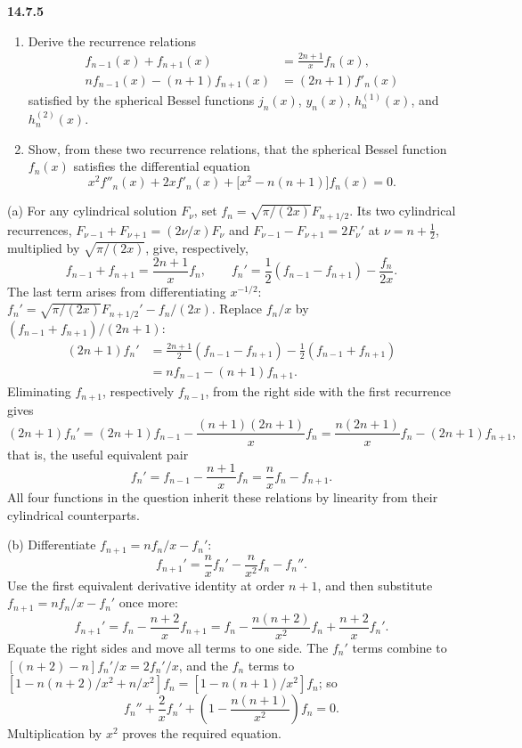 \par\bigskip
\noindent\textbf{14.7.5}
\begin{enumerate}
\item[(a)] Derive the recurrence relations
\begin{align*}
f_{n-1}(x)+f_{n+1}(x)&=\frac{2n+1}{x}f_{n}(x),\\
nf_{n-1}(x)-(n+1)f_{n+1}(x)&=(2n+1)f'_{n}(x)
\end{align*}
satisfied by the spherical Bessel functions $j_{n}(x)$, $y_{n}(x)$,
$h_{n}^{(1)}(x)$, and $h_{n}^{(2)}(x)$.
\item[(b)] Show, from these two recurrence relations, that the
spherical Bessel function $f_{n}(x)$ satisfies the differential
equation
\[
x^{2}f''_{n}(x)+2xf'_{n}(x)+\big[x^{2}-n(n+1)\big]f_{n}(x)=0.
\]
\end{enumerate}
\solution
(a) For any cylindrical solution $F_\nu$, set
$f_n=\sqrt{\pi/(2x)}F_{n+1/2}$. Its two cylindrical recurrences,
$F_{\nu-1}+F_{\nu+1}=(2\nu/x)F_\nu$ and $F_{\nu-1}-F_{\nu+1}=2F_\nu'$
at $\nu=n+\frac12$, multiplied by $\sqrt{\pi/(2x)}$,
give, respectively,
\[
f_{n-1}+f_{n+1}=\frac{2n+1}{x}f_n,
\qquad
f_n'=\frac12(f_{n-1}-f_{n+1})-\frac{f_n}{2x}.
\]
The last term arises from differentiating $x^{-1/2}$:
$f_n'=\sqrt{\pi/(2x)}F_{n+1/2}'-f_n/(2x)$.
Replace $f_n/x$ by $(f_{n-1}+f_{n+1})/(2n+1)$:
\begin{align*}
(2n+1)f_n'
&=\frac{2n+1}{2}(f_{n-1}-f_{n+1})
-\frac12(f_{n-1}+f_{n+1})\\
&=nf_{n-1}-(n+1)f_{n+1}.
\end{align*}
Eliminating $f_{n+1}$, respectively $f_{n-1}$, from the right side
with the first recurrence gives
\[
(2n+1)f_n'=(2n+1)f_{n-1}-\frac{(n+1)(2n+1)}xf_n
=\frac{n(2n+1)}xf_n-(2n+1)f_{n+1},
\]
that is, the useful equivalent pair
\[
f_n'=f_{n-1}-\frac{n+1}{x}f_n
=\frac nxf_n-f_{n+1}.
\]
All four functions in the question inherit these relations by
linearity from their cylindrical counterparts.

(b) Differentiate $f_{n+1}=nf_n/x-f_n'$:
\[
f_{n+1}'=\frac nx f_n'-\frac n{x^2}f_n-f_n''.
\]
Use the first equivalent derivative identity at order $n+1$, and
then substitute $f_{n+1}=nf_n/x-f_n'$ once more:
\[
f_{n+1}'=f_n-\frac{n+2}{x}f_{n+1}
=f_n-\frac{n(n+2)}{x^2}f_n+\frac{n+2}{x}f_n'.
\]
Equate the right sides and move all terms to one side. The $f_n'$
terms combine to $[(n+2)-n]f_n'/x=2f_n'/x$, and the $f_n$ terms to
$[1-n(n+2)/x^2+n/x^2]f_n=[1-n(n+1)/x^2]f_n$; so
\[
f_n''+\frac2x f_n'+\left(1-\frac{n(n+1)}{x^2}\right)f_n=0.
\]
Multiplication by $x^2$ proves the required equation.

